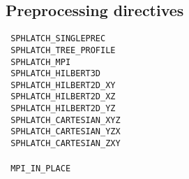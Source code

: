\subsection{Preprocessing directives}
\verb| SPHLATCH_SINGLEPREC | \\
\verb| SPHLATCH_TREE_PROFILE |\\
\verb| SPHLATCH_MPI |\\
\verb| SPHLATCH_HILBERT3D |\\
\verb| SPHLATCH_HILBERT2D_XY  |\\
\verb| SPHLATCH_HILBERT2D_XZ  |\\
\verb| SPHLATCH_HILBERT2D_YZ  |\\
\verb| SPHLATCH_CARTESIAN_XYZ |\\
\verb| SPHLATCH_CARTESIAN_YZX |\\
\verb| SPHLATCH_CARTESIAN_ZXY |\\
\\
\verb| MPI_IN_PLACE |\\


